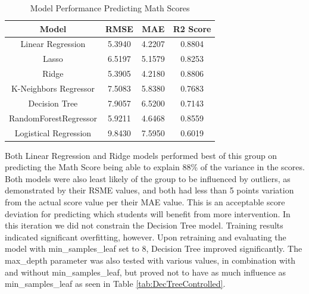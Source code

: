 \documentclass[man,floatsintext]{apa6} %
\begin{document}
\begin{table}[H]
    \centering
    \caption{Model Performance Predicting Math Scores}
    \begin{tabular}{|c|c|c|c|}
    \hline
         Model & RMSE & MAE & R2 Score\\
         \hline\hline
         Linear Regression & 5.3940 & 4.2207 & 0.8804\\
         \hline
         Lasso & 6.5197 & 5.1579 & 0.8253\\
         \hline
         Ridge & 5.3905 & 4.2180 & 0.8806\\
         \hline
         K-Neighbors Regressor & 7.5083 & 5.8380 & 0.7683\\
         \hline
         Decision Tree & 7.9057 & 6.5200 & 0.7143\\
         \hline
         RandomForestRegressor & 5.9211 & 4.6468 & 0.8559\\
         \hline
         Logistical Regression & 9.8430 & 7.5950 & 0.6019\\
         \hline
    \end{tabular}
    \label{tab:InitModelPerfMath}
\end{table}
Both Linear Regression and Ridge models performed best of this group on predicting the Math Score being able to explain 88\% of the variance in the scores. Both models were also least likely of the group to be influenced by outliers, as demonstrated by their RSME values, and both had less than 5 points variation from the actual score value per their MAE value.  This is an acceptable score deviation for predicting which students will benefit from more intervention.
In this iteration we did not constrain the Decision Tree model. Training results indicated significant overfitting, however. Upon retraining and evaluating the model with min\_samples\_leaf set to 8, Decision Tree improved significantly. The max\_depth parameter was also tested with various values, in combination with and without min\_samples\_leaf, but proved not to have as much influence as min\_samples\_leaf as seen in Table \ref{tab:DecTreeControlled}.
\end{document}
